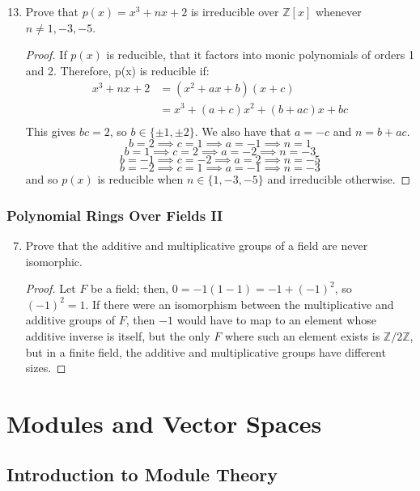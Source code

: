 \documentclass{report}
\newcommand{\Z}{\mathbb{Z}}
\begin{document}
\begin{enumerate}
	\setcounter{enumi}{12}
	\item Prove that $p(x)=x^3+nx+2$ is irreducible over $\Z[x]$ whenever $n\neq 1,-3,-5$.
	\begin{proof}
		If $p(x)$ is reducible, that it factors into monic polynomials of orders 1 and 2. Therefore, p(x) is reducible if: 
		\begin{align*}
			x^3+nx+2 &= (x^2+ax+b)(x+c)\\
				 &= x^3 + (a+c)x^2 + (b+ac)x + bc\\
		\end{align*}
		This gives $bc=2$, so $b\in \{\pm 1,\pm 2\}$. We also have that $a=-c$ and $n=b+ac$. 
		$$b=2\implies c=1 \implies a=-1 \implies n=1$$
		$$b=1\implies c=2 \implies a =-2 \implies n=-3$$
		$$b=-1 \implies c=-2 \implies a=2 \implies n=-5$$
		$$b=-2\implies c=1 \implies a=-1 \implies n=-3$$
		and so $p(x)$ is reducible when $n\in\{1,-3,-5\}$ and irreducible otherwise.
	\end{proof}

\end{enumerate}

\section{Polynomial Rings Over Fields II}

\begin{enumerate}
	\setcounter{enumi}{6}
	\item Prove that the additive and multiplicative groups of a field are never isomorphic.
	\begin{proof}
		Let $F$ be a field; then, $0=-1(1-1)=-1+(-1)^2$, so $(-1)^2=1$.
		If there were an isomorphism between the multiplicative and additive groups of $F$, 
		then $-1$ would have to map to an element whose additive inverse is itself, 
		but the only $F$ where such an element exists is $\Z/2\Z$, but in a finite field, the additive and multiplicative groups have different sizes.
	\end{proof}
\end{enumerate}

\part{Modules and Vector Spaces}
\chapter{Introduction to Module Theory}
\end{document}
